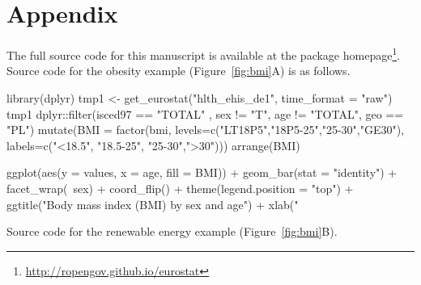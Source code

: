 \address{Przemys{\l}aw Biecek\\
  Faculty of Mathematics and Information Science\\
  Warsaw University of Technology\\
  Koszykowa 75, 00-662 Warsaw\\
  Poland\\}

\newpage

\section{Appendix}

The full source code for this manuscript is available at the package homepage\footnote{\url{http://ropengov.github.io/eurostat}}. Source code for the obesity example (Figure~\ref{fig:bmi}A) is as follows.

\begin{example}
  library(dplyr)
  tmp1 <- get_eurostat("hlth_ehis_de1", time_format = "raw")
  tmp1 %
    dplyr::filter(isced97 == "TOTAL" ,
         sex != "T", age != "TOTAL", geo == "PL") %
    mutate(BMI = factor(bmi, 
                        levels=c("LT18P5","18P5-25","25-30","GE30"), 
                        labels=c("<18.5", "18.5-25", "25-30",">30"))) %
    arrange(BMI) %
    
    ggplot(aes(y = values, x = age, fill = BMI)) + geom_bar(stat = "identity") +
      facet_wrap(~sex) + coord_flip() +
      theme(legend.position = "top") +
      ggtitle("Body mass index (BMI) by sex and age") +
      xlab("%
\end{example}


Source code for the renewable energy example (Figure~\ref{fig:bmi}B).

